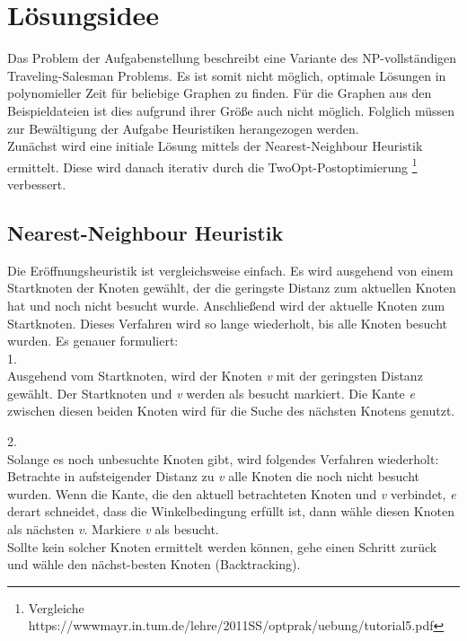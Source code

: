 \maketitle
\tableofcontents

\vspace{0.5cm}


\section{Lösungsidee}\label{sec:losungsidee}
Das Problem der Aufgabenstellung beschreibt eine Variante des NP-vollständigen Traveling-Salesman Problems.
Es ist somit nicht möglich, optimale Lösungen in polynomieller Zeit für beliebige Graphen zu finden.
Für die Graphen aus den Beispieldateien ist dies aufgrund ihrer Grö{\ss}e auch nicht möglich.
Folglich müssen zur Bewältigung der Aufgabe Heuristiken herangezogen werden. \\
Zunächst wird eine initiale Lösung mittels der Nearest-Neighbour Heuristik ermittelt.
Diese wird danach iterativ durch die TwoOpt-Postoptimierung \footnote{Vergleiche https://wwwmayr.in.tum.de/lehre/2011SS/optprak/uebung/tutorial5.pdf} verbessert.

\subsection{Nearest-Neighbour Heuristik}\label{subsec:nearest-neighbour-heuristik}
Die Eröffnungsheuristik ist vergleichsweise einfach.
Es wird ausgehend von einem Startknoten der Knoten gewählt, der die
geringste Distanz zum aktuellen Knoten hat und noch nicht besucht wurde.
Anschlie{\ss}end wird der aktuelle Knoten zum Startknoten.
Dieses Verfahren wird so lange wiederholt, bis alle Knoten besucht wurden.
Es genauer formuliert: \\
1. \\
Ausgehend vom Startknoten, wird der Knoten \textit{v} mit der geringsten Distanz gewählt.
Der Startknoten und \textit{v} werden als besucht markiert.
Die Kante \textit{e} zwischen diesen beiden Knoten wird für die Suche des nächsten Knotens genutzt.

2. \\
Solange es noch unbesuchte Knoten gibt, wird folgendes Verfahren wiederholt:
Betrachte in aufsteigender Distanz zu \textit{v} alle Knoten die noch nicht besucht wurden.
Wenn die Kante, die den aktuell betrachteten Knoten und \textit{v} verbindet, \textit{e}
derart schneidet, dass die Winkelbedingung erfüllt ist, dann wähle diesen Knoten als nächsten \textit{v}.
Markiere \textit{v} als besucht. \\
Sollte kein solcher Knoten ermittelt werden können, gehe einen Schritt zurück und wähle den nächst-besten Knoten (Backtracking).

